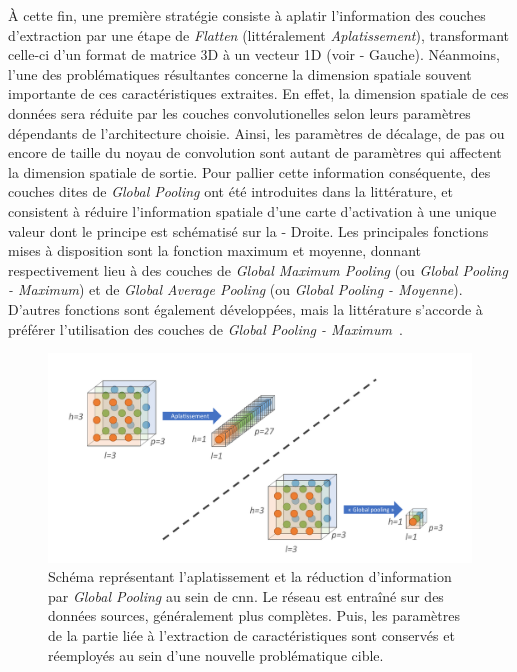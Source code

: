 À cette fin, une première stratégie consiste à aplatir l'information des couches d'extraction par une étape de \textit{Flatten} (littéralement \textit{Aplatissement}), transformant celle-ci d'un format de matrice 3D à un vecteur 1D (voir  - Gauche). Néanmoins, l'une des problématiques résultantes concerne la dimension spatiale souvent importante de ces caractéristiques extraites. En effet, la dimension spatiale de ces données sera réduite par les couches convolutionelles selon leurs paramètres dépendants de l'architecture choisie. Ainsi, les paramètres de décalage, de pas ou encore de taille du noyau de convolution sont autant de paramètres qui affectent la dimension spatiale de sortie. Pour pallier cette information conséquente, des couches dites de \textit{Global Pooling} ont été introduites dans la littérature, et consistent à réduire l'information spatiale d'une carte d'activation à une unique valeur dont le principe est schématisé sur la  - Droite. Les principales fonctions mises à disposition sont la fonction maximum et moyenne, donnant respectivement lieu à des couches de \textit{Global Maximum Pooling} (ou \textit{Global Pooling - Maximum}) et de \textit{Global Average Pooling} (ou \textit{Global Pooling - Moyenne}). D'autres fonctions sont également développées, mais la littérature s'accorde à préférer l'utilisation des couches de \textit{Global Pooling - Maximum}~\cite{christlein2019}.\par

\begin{figure}[H]
    \centering
    \includegraphics[width=\linewidth]{contents/chapter_5/resources/scheme_global_pooling.pdf}
    \caption{Schéma représentant l'aplatissement et la réduction d'information par \textit{Global Pooling} au sein de \gls{cnn}. Le réseau est entraîné sur des données sources, généralement plus complètes. Puis, les paramètres de la partie liée à l'extraction de caractéristiques sont conservés et réemployés au sein d'une nouvelle problématique cible.}
    \label{fig:scheme_global_pooling}
\end{figure}\par

